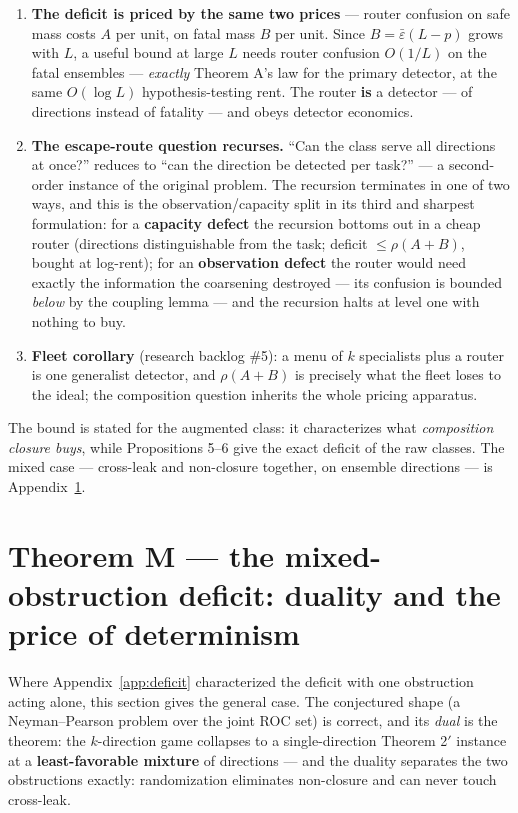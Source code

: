 \documentclass[11pt]{article}
\theoremstyle{plain}
\theoremstyle{definition}
\begin{document}
\begin{enumerate}
\item \textbf{The deficit is priced by the same two prices} --- router confusion on
   safe mass costs $A$ per unit, on fatal mass $B$ per unit. Since
   $B = \bar\varepsilon(L - p)$ grows with $L$, a useful bound at large $L$
   needs router confusion $O(1/L)$ on the fatal ensembles --- \emph{exactly}
   Theorem A's law for the primary detector, at the same
   $O(\log L)$ hypothesis-testing rent. The router \textbf{is} a detector --- of
   directions instead of fatality --- and obeys detector economics.
\item \textbf{The escape-route question recurses.} ``Can the class serve all
   directions at once?'' reduces to ``can the direction be detected per task?''
   --- a second-order instance of the original problem. The recursion
   terminates in one of two ways, and this is the observation/capacity split
   in its third and sharpest formulation: for a \textbf{capacity defect} the
   recursion bottoms out in a cheap router (directions distinguishable from
   the task; deficit $\leq \rho(A{+}B)$, bought at log-rent); for an
   \textbf{observation defect} the router would need exactly the information the
   coarsening destroyed --- its confusion is bounded \emph{below} by the coupling
   lemma --- and the recursion halts at level one with nothing to buy.
\item \textbf{Fleet corollary} (research backlog \#5): a menu of $k$ specialists plus a
   router is one generalist detector, and $\rho(A + B)$ is precisely what the
   fleet loses to the ideal; the composition question inherits the whole
   pricing apparatus.
\end{enumerate}

The bound is stated for the augmented class: it characterizes what
\emph{composition closure buys}, while Propositions 5--6 give the exact deficit of
the raw classes. The mixed case --- cross-leak and non-closure together, on
ensemble directions --- is Appendix~\ref{app:thmM}.

\section{Theorem M --- the mixed-obstruction deficit: duality and the price of determinism}\label{app:thmM}

Where Appendix~\ref{app:deficit} characterized the deficit with one obstruction acting alone, this
section gives the general case. The conjectured shape (a Neyman--Pearson
problem over the joint ROC set) is correct, and its \emph{dual} is the theorem:
the $k$-direction game collapses to a single-direction Theorem 2$'$ instance at a
\textbf{least-favorable mixture} of directions --- and the duality separates the two
obstructions exactly: randomization eliminates non-closure and can never
touch cross-leak.
\end{document}
